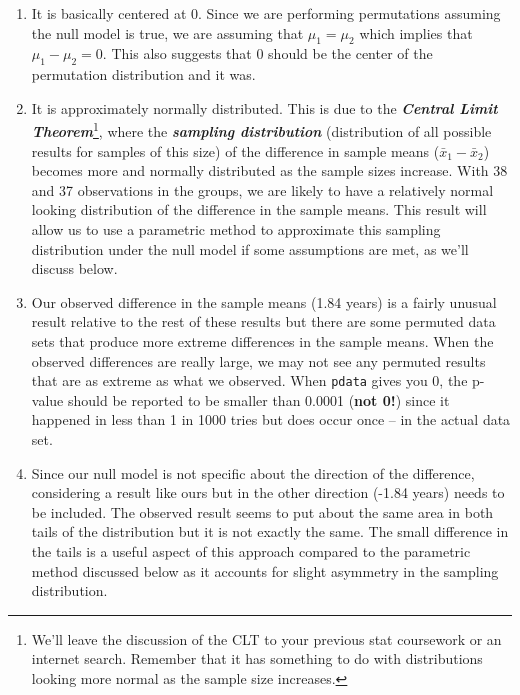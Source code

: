 \documentclass[]{book}
\let\rmarkdownfootnote\footnote%
\def\footnote{\protect\rmarkdownfootnote}
\theoremstyle{definition}
\theoremstyle{definition}
\theoremstyle{remark}
\begin{document}
\begin{enumerate}
\def\labelenumi{\arabic{enumi}.}
\item
  It is basically centered at 0. Since we are performing permutations
  assuming the null model is true, we are assuming that
  \(\mu_1 = \mu_2\) which implies that \(\mu_1 - \mu_2 = 0\). This also
  suggests that 0 should be the center of the permutation distribution
  and it was.
\item
  It is approximately normally distributed. This is due to the
  \textbf{\emph{Central Limit Theorem}}\footnote{We'll leave the
    discussion of the CLT to your previous stat coursework or an
    internet search. Remember that it has something to do with
    distributions looking more normal as the sample size increases.},
  where the \textbf{\emph{sampling distribution}} (distribution of all
  possible results for samples of this size) of the difference in sample
  means (\(\bar{x}_1 - \bar{x}_2\)) becomes more and normally
  distributed as the sample sizes increase. With 38 and 37 observations
  in the groups, we are likely to have a relatively normal looking
  distribution of the difference in the sample means. This result will
  allow us to use a parametric method to approximate this sampling
  distribution under the null model if some assumptions are met, as
  we'll discuss below.
\item
  Our observed difference in the sample means (1.84 years) is a fairly
  unusual result relative to the rest of these results but there are
  some permuted data sets that produce more extreme differences in the
  sample means. When the observed differences are really large, we may
  not see any permuted results that are as extreme as what we observed.
  When \texttt{pdata} gives you 0, the p-value should be reported to be
  smaller than 0.0001 (\textbf{not 0!}) since it happened in less than 1
  in 1000 tries but does occur once -- in the actual data set.
\item
  Since our null model is not specific about the direction of the
  difference, considering a result like ours but in the other direction
  (-1.84 years) needs to be included. The observed result seems to put
  about the same area in both tails of the distribution but it is not
  exactly the same. The small difference in the tails is a useful aspect
  of this approach compared to the parametric method discussed below as
  it accounts for slight asymmetry in the sampling distribution.
\end{enumerate}
\end{document}
